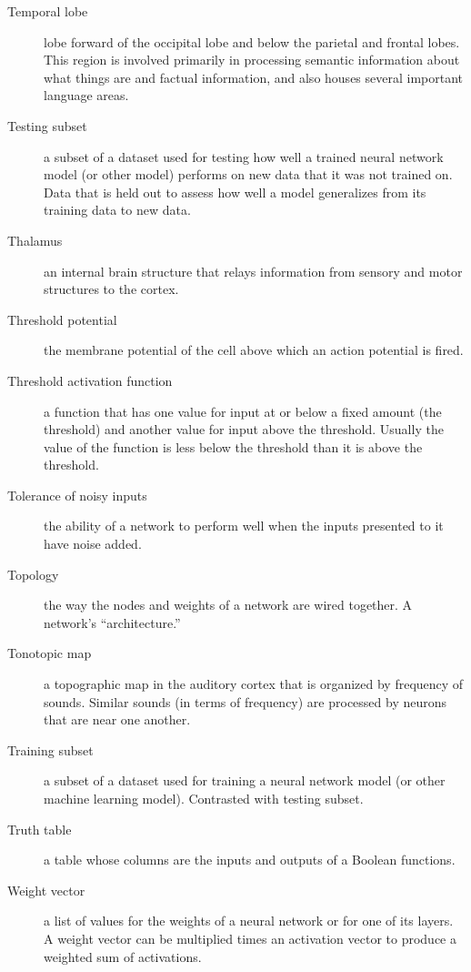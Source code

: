 \begin{description}
\item[Temporal lobe] lobe forward of the occipital lobe and below the parietal and frontal lobes. This region is involved primarily in processing semantic information about what things are and factual information, and also houses several important language areas.

\item[Testing subset] a subset of a dataset used for testing how well a trained neural network model (or other model) performs on new data that it was not trained on. Data that is held out to assess how well a model generalizes from its training data to new data.

\item[Thalamus] an internal brain structure that relays information from sensory and motor structures to the cortex.

\item[Threshold potential] the membrane potential of the cell above which an action potential is fired. 

\item[Threshold activation function] a function that has one value for  input at or below a fixed amount (the threshold) and another value for input above the threshold. Usually the value of the function is less below the  threshold than it is above the threshold.

\item[Tolerance of noisy inputs] the ability of a network to perform well when the inputs presented to it have noise added.

\item[Topology] the way the nodes and weights of a network are wired together. A network's ``architecture.''

\item[Tonotopic map] a topographic map in the auditory cortex that is organized by frequency of sounds. Similar sounds (in terms of frequency) are processed by neurons that are near one another.

\item[Training subset] a subset of a dataset used for training a neural network model (or other machine learning model). Contrasted with testing subset.

\item[Truth table] a table whose columns are the inputs and outputs of a Boolean functions.

\item[Weight vector] a list of values for the weights of a neural network or for one of its layers. A weight vector can be multiplied times an activation vector to produce a weighted sum of activations.


\end{description}
